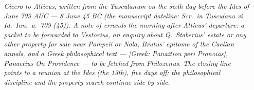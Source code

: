 
\textit{Cicero to Atticus, written from the Tusculanum
on the sixth day before the Ides of June 709 AUC ---
8 June 45 BC (the manuscript dateline: \textit{Scr.\
in Tusculano vi Id.\ Iun.\ a.\ 709 (45)}). A note of
errands the morning after Atticus' departure: a packet
to be forwarded to Vestorius, an enquiry about
Q.~Staberius' estate or any other property for sale
near Pompeii or Nola, Brutus' epitome of the Caelian
annals, and a Greek philosophical text ---
\textit{[Greek: Panaitiou peri Pronoias]}, Panaetius
\textit{On Providence} --- to be fetched from
Philoxenus. The closing line points to a reunion at
the Ides (the 13th), five days off; the philosophical
discipline and the property search continue side by
side.}
